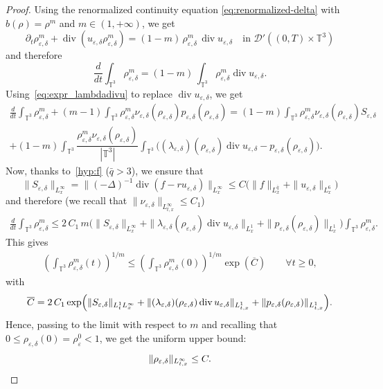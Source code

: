 \documentclass[JEP,XML,SOM,Unicode,NoEqCountersInSection]{cedram}
\let\mathcal\mathscr
\newcommand{\<}{\bigl\langle}
\renewcommand{\>}{\bigr\rangle}
\theoremstyle{definition}
\theoremstyle{remark}
\newcommand{\TT}{\mathbb{T}^3}
\DeclareMathOperator{\Div}{div}
\let\ep\varepsilon
\begin{document}
\begin{proof}
Using the renormalized continuity equation \eqref{eq:renormalized-delta} with $b(\rho) = \rho^m$ and $m \in (1,+\infty)$, we get
\[
\partial_t \rho_{\ep,\delta}^m + \Div (u_{\ep,\delta} \rho_{\ep,\delta}^m)
= (1-m) \, \rho_{\ep,\delta}^m \, \Div u_{\ep,\delta} \quad \text{in } \mathcal{D}'((0,T)\times \TT)
\]
and therefore
\[
\frac{d}{dt} \int_{\TT} \rho_{\ep,\delta}^m = (1-m)\, \int_{\TT} \rho_{\ep,\delta}^m \Div u_{\ep,\delta}.
\]
Using~\eqref{eq:expr_lambdadivu} to replace $\Div u_{\ep,\delta}$, we get
\begin{multline*}
\frac{d}{dt} \int_{\TT}\rho_{\ep,\delta}^m + (m-1) \int_{\TT} \rho_{\ep,\delta}^m
\nu_{\ep,\delta}(\rho_{\ep,\delta}) p_{\ep,\delta}(\rho_{\ep,\delta})
= (1-m) \int_{\TT} \rho_{\ep,\delta}^m
\nu_{\ep,\delta}(\rho_{\ep,\delta}) S_{\ep,\delta}\\
+ (1-m) \int_{\TT} \dfrac{\rho_{\ep,\delta}^m \nu_{\ep,\delta}(\rho_{\ep,\delta})}{|\TT|} \int_{\TT}{ \big((\lambda_{\ep,\delta})(\rho_{\ep,\delta}) \Div u_{\ep,\delta}
- p_{\ep,\delta}(\rho_{\ep,\delta}) \big) }.
\end{multline*}
Now, thanks to~\eqref{hyp:f} ($\bar{q} > 3$), we ensure that
\[
\|S_{\varepsilon,\delta}\|_{L^\infty_x} = \|(-\Delta)^{-1}\Div (f-ru_{\ep,\delta})\|_{L^\infty_x} \leq C \big(\|f\|_{L^{\bar{q}}_x}+ \|u_{\ep,\delta}\|_{L^6_x} \big)
\]
and therefore (we recall that $\|\nu_{\ep,\delta}\|_{L^\infty_{t,x}} \leq C_1$)
\begin{align*}
\frac{d}{dt} \int_{\TT} \rho_{\varepsilon,\delta}^m
\leq 2 \, C_1 \, m \Big(\|S_{\ep,\delta}\|_{L^\infty_x}
+ \| \lambda_{\ep,\delta}(\rho_{\ep,\delta}) \Div u_{\ep,\delta} \|_{L^1_x}
+ \|p_{\ep,\delta}(\rho_{\ep,\delta})\|_{L^1_x} \Big)
\int_{\TT} \rho_{\ep,\delta}^m.
\end{align*}
This gives
\begin{align*}
\left(\int_{\TT} \rho_{\varepsilon,\delta}^m(t)\right)^{1/m} \leq
\left(\int_{\TT} \rho_{\varepsilon,\delta}^m(0)\right)^{1/m} \exp (\overline C) \qquad \forall t \geq 0,
\end{align*} 
with
\[
\overline{C} = 2\, C_1 \exp\Bigl(\|S_{\ep,\delta}\|_{L^1_t L^\infty_x}
+ \| (\lambda_{\ep,\delta})(\rho_{\ep,\delta}) \Div u_{\ep,\delta} \|_{L^1_{t,x}}
+ \|p_{\ep,\delta}(\rho_{\ep,\delta})\|_{L^1_{t,x}}\Bigr).
\]
Hence, passing to the limit with respect to $m$ and recalling that $0 \leq \rho_{\ep,\delta}(0) = \rho_\ep^0 < 1$, we get the uniform upper bound:
\[
\|\rho_{\ep,\delta}\|_{L^\infty_{t,x}} \leq C.\qedhere
\]
\end{proof}
\end{document}
